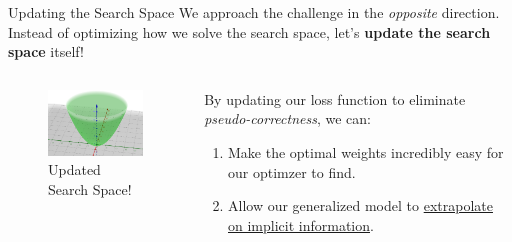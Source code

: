 \documentclass{beamer}
\begin{document}
\begin{frame}{Updating the Search Space}
	We approach the challenge in the \textit{opposite} direction. \pause Instead of optimizing how we solve the search space, let's \textbf{update the search space} itself! \pause \newline \\

	\begin{columns}
		\begin{column}{.3\textwidth}
			\begin{figure}
				\includegraphics[width=4.5cm]{img/space.png}
				\caption*{\footnotesize Updated Search Space!}
			\end{figure}
		\end{column}
		\begin{column}{.5\textwidth}
			By updating our loss function to eliminate \textit{pseudo-correctness}, we can: \pause
			\begin{enumerate}[label=-]
				\item Make the optimal weights incredibly easy for our optimzer to find. \pause
				\item Allow our generalized model to \underline{extrapolate on implicit information}.
			\end{enumerate}
		\end{column}
	\end{columns}
\end{frame}
\end{document}
